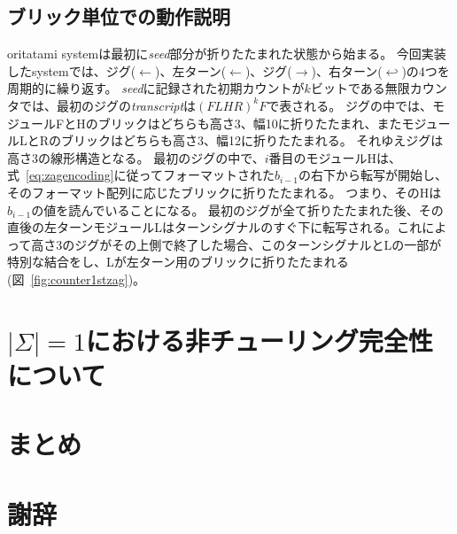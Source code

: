 \documentclass[a4j,11pt]{article}
\begin{document}
\subsection{ブリック単位での動作説明}
oritatami systemは最初に\textit{seed}部分が折りたたまれた状態から始まる。
今回実装したsystemでは、ジグ($\leftarrow$)、左ターン($\leftarrow$)、ジグ($\rightarrow$)、右ターン($\hookleftarrow$)の4つを周期的に繰り返す。
\textit{seed}に記録された初期カウントが$k$ビットである無限カウンタでは、最初のジグの\textit{transcript}は$(FLHR)^k F$で表される。
ジグの中では、モジュールFとHのブリックはどちらも高さ3、幅10に折りたたまれ、またモジュールLとRのブリックはどちらも高さ3、幅12に折りたたまれる。
それゆえジグは高さ3の線形構造となる。
最初のジグの中で、$i$番目のモジュールHは、式~\ref{eq:zagencoding}に従ってフォーマットされた$b_{i-1}$の右下から転写が開始し、そのフォーマット配列に応じたブリックに折りたたまれる。
つまり、そのHは$b_{i-1}$の値を読んでいることになる。
最初のジグが全て折りたたまれた後、その直後の左ターンモジュールLはターンシグナルのすぐ下に転写される。これによって高さ3のジグがその上側で終了した場合、このターンシグナルとLの一部が特別な結合をし、Lが左ターン用のブリックに折りたたまれる(図~\ref{fig:counter1stzag})。

\section{$| \Sigma | = 1$における非チューリング完全性について}

\section{まとめ}

\section{謝辞}



\end{document}
